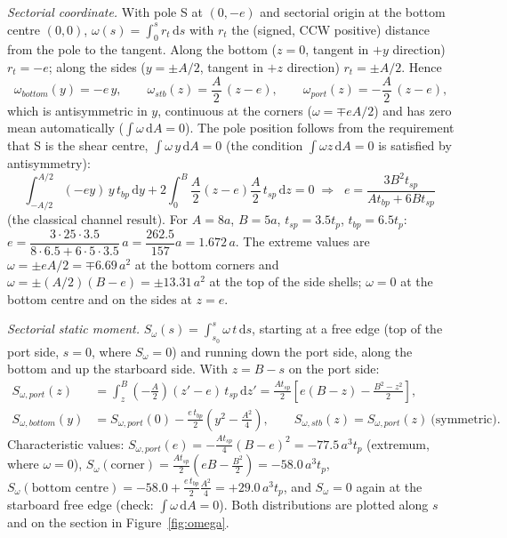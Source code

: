 \bigskip
\emph{Sectorial coordinate.} With pole S at $(0,-e)$ and sectorial origin at the bottom centre $(0,0)$, $\omega(s)=\int_0^s r_t\,\mathrm{d}s$ with $r_t$ the (signed, CCW positive) distance from the pole to the tangent. Along the bottom ($z=0$, tangent in $+y$ direction) $r_t=-e$; along the sides ($y=\pm A/2$, tangent in $+z$ direction) $r_t=\pm A/2$. Hence
\begin{equation}
  \omega_{bottom}(y)=-e\,y,\qquad \omega_{stb}(z)=\frac{A}{2}\,(z-e),\qquad \omega_{port}(z)=-\frac{A}{2}\,(z-e),
  \label{eq:omegaU}
\end{equation}
which is antisymmetric in $y$, continuous at the corners ($\omega=\mp eA/2$) and has zero mean automatically ($\int\omega\,\mathrm{d}A=0$). The pole position follows from the requirement that S is the shear centre, $\int\omega\,y\,\mathrm{d}A=0$ (the condition $\int\omega z\,\mathrm{d}A=0$ is satisfied by antisymmetry):
\begin{equation}
  \int_{-A/2}^{A/2}(-ey)\,y\,t_{bp}\,\mathrm{d}y+2\int_0^B\frac{A}{2}(z-e)\frac{A}{2}\,t_{sp}\,\mathrm{d}z=0
  \;\Rightarrow\;
  \boxed{\;e=\frac{3B^2t_{sp}}{At_{bp}+6Bt_{sp}}\;}
\end{equation}
(the classical channel result). For $A=8a$, $B=5a$, $t_{sp}=3.5t_p$, $t_{bp}=6.5t_p$: $e=\dfrac{3\cdot25\cdot3.5}{8\cdot6.5+6\cdot5\cdot3.5}\,a=\dfrac{262.5}{157}a=1.672\,a$. The extreme values are $\omega=\pm eA/2=\mp6.69\,a^2$ at the bottom corners and $\omega=\pm(A/2)(B-e)=\pm13.31\,a^2$ at the top of the side shells; $\omega=0$ at the bottom centre and on the sides at $z=e$.

\emph{Sectorial static moment.} $S_\omega(s)=\int_{s_0}^{s}\omega\,t\,\mathrm{d}s$, starting at a free edge (top of the port side, $s=0$, where $S_\omega=0$) and running down the port side, along the bottom and up the starboard side. With $z=B-s$ on the port side:
\begin{align}
  S_{\omega,port}(z)&=\int_z^{B}\left(-\frac{A}{2}\right)(z'-e)\,t_{sp}\,\mathrm{d}z' = \frac{At_{sp}}{2}\left[e(B-z)-\frac{B^2-z^2}{2}\right],\\
  S_{\omega,bottom}(y)&=S_{\omega,port}(0)-\frac{e\,t_{bp}}{2}\left(y^2-\frac{A^2}{4}\right),\qquad S_{\omega,stb}(z)=S_{\omega,port}(z)\ \text{(symmetric)}.
\end{align}
Characteristic values: $S_{\omega,port}(e)=-\frac{At_{sp}}{4}(B-e)^2=-77.5\,a^3t_p$ (extremum, where $\omega=0$), $S_\omega(\text{corner})=\frac{At_{sp}}{2}\left(eB-\tfrac{B^2}{2}\right)=-58.0\,a^3t_p$, $S_\omega(\text{bottom centre})=-58.0+\frac{e\,t_{bp}}{2}\frac{A^2}{4}=+29.0\,a^3t_p$, and $S_\omega=0$ again at the starboard free edge (check: $\int\omega\,\mathrm{d}A=0$). Both distributions are plotted along $s$ and on the section in Figure~\ref{fig:omega}.

